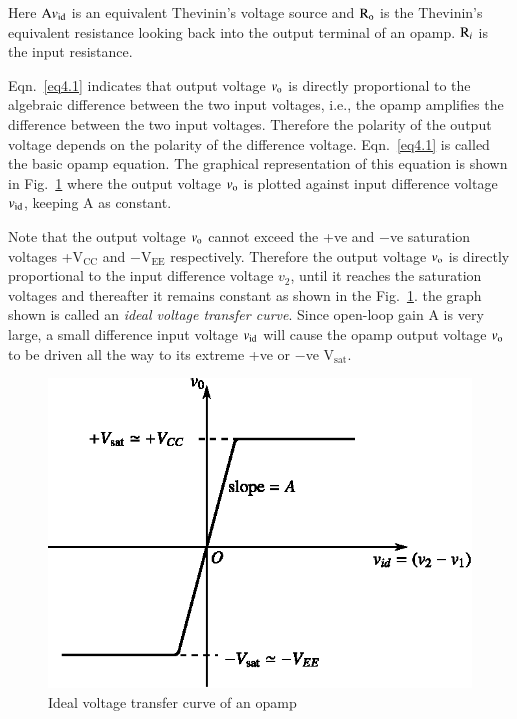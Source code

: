Here $\textrm{A} v_{\operatorname{id}}$ is an equivalent Thevinin's voltage source and $\textrm{R}_{\textrm{o}}$ is the Thevinin's equivalent resistance looking back into the output terminal of an opamp. $\textrm{R}_{i}$ is the input resistance.

Eqn.~\eqref{eq4.1} indicates that output voltage $v_{\textrm{o}}$ is directly proportional to the algebraic difference between the two input voltages, i.e., the opamp amplifies the difference between the two input voltages. Therefore the polarity of the output voltage depends on the polarity of the difference voltage. Eqn.~\eqref{eq4.1} is called the basic opamp equation. The graphical representation of this equation is shown in Fig.~\ref{fig4.3} where the output voltage $v_{\textrm{o}}$ is plotted against input difference voltage $v_{\operatorname{id}}$, keeping A as constant.

Note that the output voltage $v_{\textrm{o}}$ cannot exceed the +ve and $-$ve saturation voltages +V$_{\text{CC}}$ and $-$V$_{\text{EE}}$ respectively. Therefore the output voltage $v_{\textrm{o}}$ is directly proportional to the input difference voltage $v_{2}$, until it reaches the saturation voltages and thereafter it remains constant as shown in the Fig.~\ref{fig4.3}. the graph shown is called an {\em ideal voltage transfer curve}. Since open-loop gain A is very large, a small difference input voltage $v_{\operatorname{id}}$ will cause the opamp output voltage $v_{\textrm{o}}$ to be driven all the way to its extreme +ve or $-$ve V$_{\text{sat}}$.
\begin{figure}[H]
\centering
\includegraphics{chap4/fig4.3.eps}
\caption{Ideal voltage transfer curve of an opamp}\label{fig4.3}
\end{figure}

